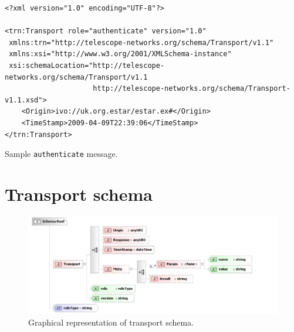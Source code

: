\documentclass[a4paper,11pt]{ivoa}
\begin{document}
\begin{listing*}
\begin{verbatim}
<?xml version="1.0" encoding="UTF-8"?>

<trn:Transport role="authenticate" version="1.0"
 xmlns:trn="http://telescope-networks.org/schema/Transport/v1.1"
 xmlns:xsi="http://www.w3.org/2001/XMLSchema-instance"
 xsi:schemaLocation="http://telescope-networks.org/schema/Transport/v1.1
                     http://telescope-networks.org/schema/Transport-v1.1.xsd">
    <Origin>ivo://uk.org.estar/estar.ex#</Origin>
    <TimeStamp>2009-04-09T22:39:06</TimeStamp>
</trn:Transport>
\end{verbatim}
\caption{Sample \texttt{authenticate} message.}
\label{lst:authenticate}
\end{listing*}

\appendix

\section{Transport schema}
\label{sec:transportschema}

\begin{figure}[H]
    \begin{center}
    \includegraphics{figures/transport.pdf}
    \end{center}

    \caption{Graphical representation of transport schema.}
    \label{fig:transport}
\end{figure}
\end{document}
